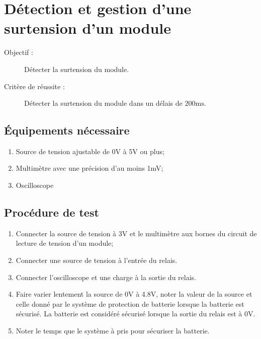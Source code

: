
\section{Détection et gestion d'une surtension d'un module}

\begin{description}
	\item[Objectif :] Détecter la surtension du module.
	\item[Critère de réussite :] Détecter la surtension du module dans un délais de $200\text{ms}$.
\end{description}

\subsection*{Équipements nécessaire}
\begin{enumerate}
	\item Source de tension ajustable de 0V à 5V ou plus;
	\item Multimètre avec une précision d'au moins 1mV;
	\item Oscilloscope
\end{enumerate}	

\subsection*{Procédure de test}
\begin{enumerate}
	\item Connecter la source de tension à 3V et le multimètre aux bornes du circuit de lecture de tension d'un module;
	\item Connecter une source de tension à l'entrée du relais.
	\item Connecter l'oscilloscope et une charge à la sortie du relais.
	\item Faire varier lentement la source de 0V à 4.8V, noter la valeur de la source et celle donné par le système de protection de batterie lorsque la batterie est sécurisé. La batterie est considéré sécurisé lorsque la sortie du relais est à 0V. 
	\item Noter le temps que le système à pris pour sécuriser la batterie.
\end{enumerate}